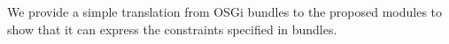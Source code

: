 We provide a simple translation from OSGi bundles to the proposed modules
to show that it can express the constraints specified in bundles.